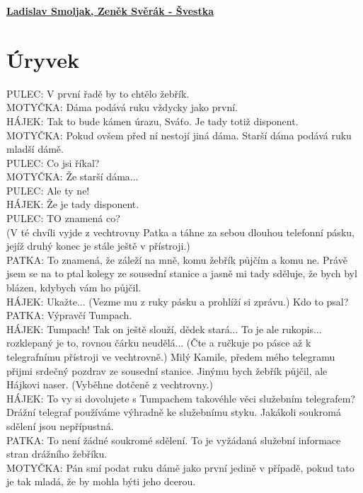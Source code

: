 \documentclass[11pt]{article}
\begin{document}
    \begin{center}
        \underline{\textbf{\Huge Ladislav Smoljak, Zeněk Svěrák - Švestka}}
    \end{center}
    \section*{Úryvek}
    PULEC: V první řadě by to chtělo žebřík.
    \\MOTYČKA: Dáma podává ruku vždycky jako první.
    \\HÁJEK: Tak to bude kámen úrazu, Sváťo. Je tady totiž disponent.
    \\MOTYČKA: Pokud ovšem před ní nestojí jiná dáma. Starší dáma podává ruku mladší dámě.
    \\PULEC: Co jsi říkal?
    \\MOTYČKA: Že starší dáma...
    \\PULEC: Ale ty ne!
    \\HÁJEK: Že je tady disponent.
    \\PULEC: TO znamená co?
    \\(V té chvíli vyjde z vechtrovny Patka a táhne za sebou dlouhou telefonní pásku, jejíž druhý konec je stále ještě v přístroji.)
    \\PATKA: To znamená, že záleží na mně, komu žebřík půjčím a komu ne. Právě jsem se na to ptal kolegy ze sousední stanice a jasně mi tady sděluje, že bych byl blázen, kdybych vám ho půjčil.
    \\HÁJEK: Ukažte... (Vezme mu z ruky pásku a prohlíží si zprávu.) Kdo to psal?
    \\PATKA: Výpravčí Tumpach.
    \\HÁJEK: Tumpach! Tak on ještě slouží, dědek stará... To je ale rukopis... rozklepaný je to, rovnou čárku neudělá... (Čte a ručkuje po pásce až k telegrafnímu přístroji ve vechtrovně.) Milý Kamile, předem mého telegramu přijmi srdečný pozdrav ze sousední stanice. Jinýmu bych žebřík půjčil, ale Hájkovi naser. (Vyběhne dotčeně z vechtrovny.)
    \\HÁJEK: To vy si dovolujete s Tumpachem takovéhle věci služebním telegrafem? Drážní telegraf používáme výhradně ke služebnímu styku. Jakákoli soukromá sdělení jsou nepřípustná.
    \\PATKA: To není žádné soukromé sdělení. To je vyžádaná služební informace stran drážního žebříku.
    \\MOTYČKA: Pán smí podat ruku dámě jako první jedině v případě, pokud tato je tak mladá, že by mohla býti jeho dcerou.
\end{document}
